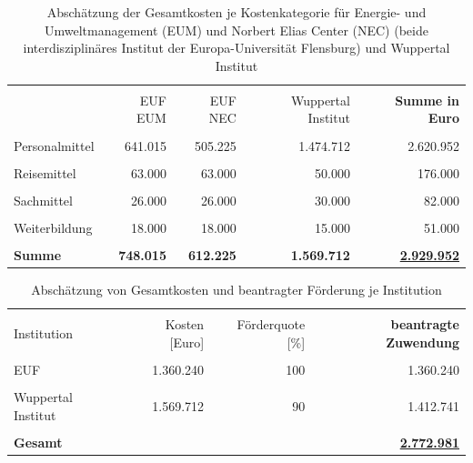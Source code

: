 \documentclass[a4paper,11pt,twoside]{scrartcl}
\begin{document}
\begin{table}[h]
\begin{center}
  \caption{Abschätzung der Gesamtkosten je Kostenkategorie für Energie- und Umweltmanagement (EUM) und Norbert Elias Center (NEC) (beide interdisziplinäres Institut der Europa-Universität Flensburg) und Wuppertal Institut}
  
\begin{tabular}[h]{|l | r | r | r | r|}
\hline
&&&&\\
& EUF EUM & EUF NEC & Wuppertal Institut & \textbf{Summe in Euro}\\
\hline
\hline
&&&&\\
 Personalmittel & 641.015 & 505.225 & 1.474.712 & 2.620.952\\
 \hline
 &&&&\\
 Reisemittel & 63.000 & 63.000 & 50.000 & 176.000\\
 \hline
 &&&&\\
 Sachmittel & 26.000 & 26.000 & 30.000 & 82.000\\
 \hline
 &&&&\\
 Weiterbildung & 18.000 & 18.000 & 15.000 & 51.000\\
 \hline
 \hline
 &&&&\\
 \textbf{Summe}& \textbf{748.015} & \textbf{612.225} & \textbf{1.569.712} & \underline{\textbf{2.929.952}}\\
 \hline
 \end{tabular}
 \label{tab:kostenkalkulation}
\end{center}
\end{table}

\begin{table}[h]
\begin{center}
  \caption{Abschätzung von Gesamtkosten und beantragter Förderung je Institution}
\begin{tabular}[h]{|l | r | r | r|}
\hline
&&&\\
Institution & Kosten [Euro] & Förderquote [\%] & \textbf{beantragte Zuwendung}\\
\hline
\hline
 &&&\\
 EUF & 1.360.240 & 100 & 1.360.240\\
 \hline
 &&&\\
 Wuppertal Institut & 1.569.712 & 90 & 1.412.741

\\
 \hline
 \hline
 &&&\\
 \textbf{Gesamt} & & &\underline{\textbf{2.772.981}}\\
 \hline
 \end{tabular}
 \label{tab:kostenkalkulation2}
\end{center}
\end{table}
\end{document}
